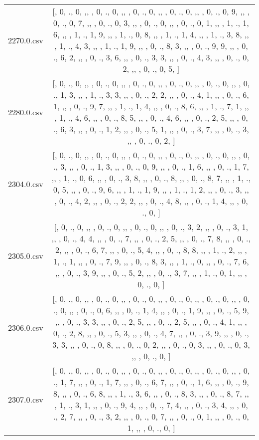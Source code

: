 \begin{table}[ht]
\begin{tabular}{@{}c c@{}}
	2270.0.csv & [, 0, ., 0, ,,  , 0, ., 0, ,,  , 0, ., 0, ,,  , 0, ., 0, ,,  , 0, ., 0, 9, ,,  , 0, ., 0, 7, ,,  , 0, ., 0, 3, ,,  , 0, ., 0, ,,  , 0, ., 0, 1, ,,  , 1, ., 1, 6, ,,  , 1, ., 1, 9, ,,  , 1, ., 0, 8, ,,  , 1, ., 1, 4, ,,  , 1, ., 3, 8, ,,  , 1, ., 4, 3, ,,  , 1, ., 1, 9, ,,  , 0, ., 8, 3, ,,  , 0, ., 9, 9, ,,  , 0, ., 6, 2, ,,  , 0, ., 3, 6, ,,  , 0, ., 3, 3, ,,  , 0, ., 4, 3, ,,  , 0, ., 0, 2, ,,  , 0, ., 0, 5, ]\\ 
	2280.0.csv & [, 0, ., 0, ,,  , 0, ., 0, ,,  , 0, ., 0, ,,  , 0, ., 0, ,,  , 0, ., 0, ,,  , 0, ., 1, 3, ,,  , 1, ., 3, 3, ,,  , 0, ., 2, 2, ,,  , 0, ., 4, 1, ,,  , 0, ., 6, 1, ,,  , 0, ., 9, 7, ,,  , 1, ., 1, 4, ,,  , 0, ., 8, 6, ,,  , 1, ., 7, 1, ,,  , 1, ., 4, 6, ,,  , 0, ., 8, 5, ,,  , 0, ., 4, 6, ,,  , 0, ., 2, 5, ,,  , 0, ., 6, 3, ,,  , 0, ., 1, 2, ,,  , 0, ., 5, 1, ,,  , 0, ., 3, 7, ,,  , 0, ., 3, ,,  , 0, ., 0, 2, ]\\ 
	2304.0.csv & [, 0, ., 0, ,,  , 0, ., 0, ,,  , 0, ., 0, ,,  , 0, ., 0, ,,  , 0, ., 0, ,,  , 0, ., 3, ,,  , 0, ., 1, 3, ,,  , 0, ., 0, 9, ,,  , 0, ., 1, 6, ,,  , 0, ., 1, 7, ,,  , 1, ., 0, 6, ,,  , 0, ., 3, 8, ,,  , 0, ., 8, ,,  , 0, ., 8, 7, ,,  , 1, ., 0, 5, ,,  , 0, ., 9, 6, ,,  , 1, ., 1, 9, ,,  , 1, ., 1, 2, ,,  , 0, ., 3, ,,  , 0, ., 4, 2, ,,  , 0, ., 2, 2, ,,  , 0, ., 4, 8, ,,  , 0, ., 1, 4, ,,  , 0, ., 0, ]\\ 
	2305.0.csv & [, 0, ., 0, ,,  , 0, ., 0, ,,  , 0, ., 0, ,,  , 0, ., 3, 2, ,,  , 0, ., 3, 1, ,,  , 0, ., 4, 4, ,,  , 0, ., 7, ,,  , 0, ., 2, 5, ,,  , 0, ., 7, 8, ,,  , 0, ., 2, ,,  , 0, ., 6, 7, ,,  , 0, ., 5, 4, ,,  , 0, ., 8, 8, ,,  , 1, ., 2, ,,  , 1, ., 1, ,,  , 0, ., 7, 9, ,,  , 0, ., 8, 3, ,,  , 1, ., 0, ,,  , 0, ., 7, 6, ,,  , 0, ., 3, 9, ,,  , 0, ., 5, 2, ,,  , 0, ., 3, 7, ,,  , 1, ., 0, 1, ,,  , 0, ., 0, ]\\ 
	2306.0.csv & [, 0, ., 0, ,,  , 0, ., 0, ,,  , 0, ., 0, ,,  , 0, ., 0, ,,  , 0, ., 0, ,,  , 0, ., 0, ,,  , 0, ., 0, 6, ,,  , 0, ., 1, 4, ,,  , 0, ., 1, 9, ,,  , 0, ., 5, 9, ,,  , 0, ., 3, 3, ,,  , 0, ., 2, 5, ,,  , 0, ., 2, 5, ,,  , 0, ., 4, 1, ,,  , 0, ., 2, 8, ,,  , 0, ., 5, 3, ,,  , 0, ., 4, 7, ,,  , 0, ., 3, 9, ,,  , 0, ., 3, 3, ,,  , 0, ., 0, 8, ,,  , 0, ., 0, 2, ,,  , 0, ., 0, 3, ,,  , 0, ., 0, 3, ,,  , 0, ., 0, ]\\ 
	2307.0.csv & [, 0, ., 0, ,,  , 0, ., 0, ,,  , 0, ., 0, ,,  , 0, ., 0, ,,  , 0, ., 0, ,,  , 0, ., 1, 7, ,,  , 0, ., 1, 7, ,,  , 0, ., 6, 7, ,,  , 0, ., 1, 6, ,,  , 0, ., 9, 8, ,,  , 0, ., 6, 8, ,,  , 1, ., 3, 6, ,,  , 0, ., 8, 3, ,,  , 0, ., 8, 7, ,,  , 1, ., 3, 1, ,,  , 0, ., 9, 4, ,,  , 0, ., 7, 4, ,,  , 0, ., 3, 4, ,,  , 0, ., 2, 7, ,,  , 0, ., 3, 2, ,,  , 0, ., 0, 7, ,,  , 0, ., 0, 1, ,,  , 0, ., 0, 1, ,,  , 0, ., 0, ]\\ 

\end{tabular}
\end{table}
